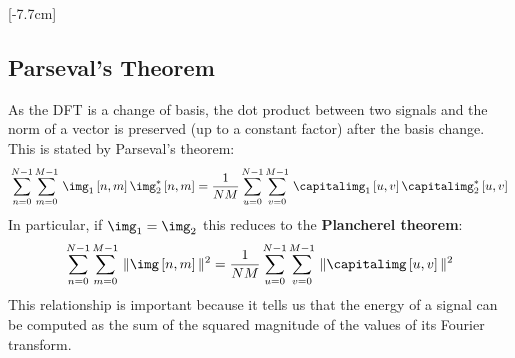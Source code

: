[-7.7cm]



\subsection{Parseval's Theorem}

As the DFT is a change of basis, the dot product between two signals and the norm of a vector is preserved (up to a constant factor) after the basis change. This is stated by Parseval's theorem:
\begin{equation}
\sum_{n=0}^{N-1} \sum_{m=0}^{M-1} \,  \img_1 \left[n,m \right] \img_2^* \left[n,m \right] = \frac{1}{NM}\sum_{u=0}^{N-1} \sum_{v=0}^{M-1} \,  \capitalimg_1 \left[u,v \right] \capitalimg_2^* \left[u,v \right]
\end{equation}
In particular, if $\img_1=\img_2$ this reduces to the {\bf Plancherel theorem}:
\begin{equation}
\sum_{n=0}^{N-1} \sum_{m=0}^{M-1} \,  \| \img \left[n,m \right] \|^2 = \frac{1}{NM}\sum_{u=0}^{N-1} \sum_{v=0}^{M-1} \,  \| \capitalimg \left[u,v \right] \|^2
\end{equation}
This relationship is important because it tells us that the energy of a signal can be computed as the sum of the squared magnitude of the values of its Fourier transform. 

